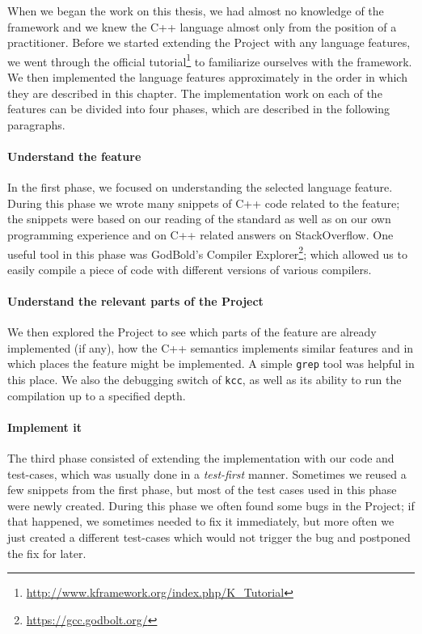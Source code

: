 \documentclass[nolot,nolof,nocover,printed]{fithesis3}
\newcommand{\kcc}{\texttt{kcc}\xspace}
\newcommand{\Project}{Project\xspace}
\begin{document}
When we began the work on this thesis, we had almost no knowledge of the \K framework and we knew the C++ language almost only from the position of a practitioner. Before we started extending the \Project with any language features, we went through the official \K tutorial\footnote{\url{http://www.kframework.org/index.php/K_Tutorial}} to familiarize ourselves with the framework. We then implemented the language features approximately in the order in which they are described in this chapter. The implementation work on each of the features can be divided into four phases, which are described in the following paragraphs.

\paragraph{Understand the feature} In the first phase, we focused on understanding the selected language feature. During this phase we wrote many snippets of C++ code related to the feature; the snippets were based on our reading of the standard as well as on our own programming experience and on C++ related answers on StackOverflow. One useful tool in this phase was GodBold's Compiler Explorer\footnote{\url{https://gcc.godbolt.org/}}; which allowed us to easily compile a piece of code with different versions of various compilers.

\paragraph{Understand the relevant parts of the \Project} We then explored the \Project to see which parts of the feature are already implemented (if any), how the C++ semantics implements similar features and in which places the feature might be implemented. A simple \texttt{grep} tool was helpful in this place. We also the debugging switch of \kcc , as well as its ability to run the compilation up to a specified depth.

\paragraph{Implement it} The third phase consisted of extending the implementation with our code and test-cases, which was usually done in a \textit{test-first} manner. Sometimes we reused a few snippets from the first phase, but most of the test cases used in this phase were newly created. During this phase we often found some bugs in the \Project; if that happened, we sometimes needed to fix it immediately, but more often we just created a different test-cases which would not trigger the bug and postponed the fix for later.
\end{document}
